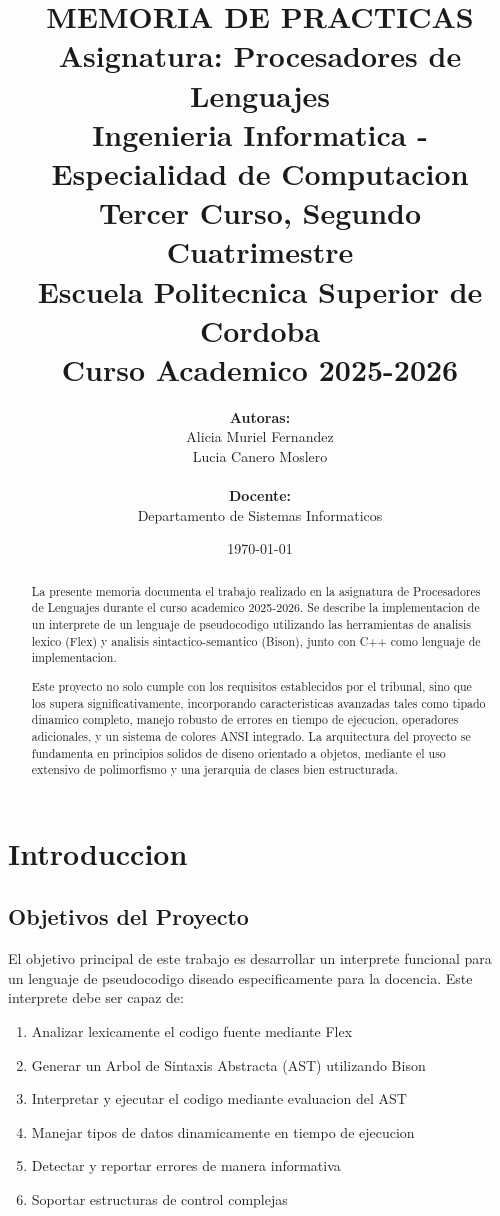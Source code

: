 \documentclass[11pt,a4paper]{article}
\title{\textbf{MEMORIA DE PRACTICAS}\\
        \large{Asignatura: Procesadores de Lenguajes}\\
        \large{Ingenieria Informatica - Especialidad de Computacion}\\
        \large{Tercer Curso, Segundo Cuatrimestre}\\
        \large{Escuela Politecnica Superior de Cordoba}\\
        \large{Curso Academico 2025-2026}}
\author{
    \textbf{Autoras:}\\
    Alicia Muriel Fernandez\\
    Lucia Canero Moslero\\
    \\
    \textbf{Docente:}\\
    Departamento de Sistemas Informaticos
}
\date{\today}
\begin{document}
\maketitle

\begin{abstract}
\noindent
La presente memoria documenta el trabajo realizado en la asignatura de Procesadores de Lenguajes durante el curso academico 2025-2026. Se describe la implementacion de un interprete de un lenguaje de pseudocodigo utilizando las herramientas de analisis lexico (Flex) y analisis sintactico-semantico (Bison), junto con C++ como lenguaje de implementacion.

Este proyecto no solo cumple con los requisitos establecidos por el tribunal, sino que los supera significativamente, incorporando caracteristicas avanzadas tales como tipado dinamico completo, manejo robusto de errores en tiempo de ejecucion, operadores adicionales, y un sistema de colores ANSI integrado. La arquitectura del proyecto se fundamenta en principios solidos de diseno orientado a objetos, mediante el uso extensivo de polimorfismo y una jerarquia de clases bien estructurada.
\end{abstract}

\tableofcontents
\newpage

\section{Introduccion}

\subsection{Objetivos del Proyecto}

El objetivo principal de este trabajo es desarrollar un interprete funcional para un lenguaje de pseudocodigo diseado especificamente para la docencia. Este interprete debe ser capaz de:

\begin{enumerate}
    \item Analizar lexicamente el codigo fuente mediante Flex
    \item Generar un Arbol de Sintaxis Abstracta (AST) utilizando Bison
    \item Interpretar y ejecutar el codigo mediante evaluacion del AST
    \item Manejar tipos de datos dinamicamente en tiempo de ejecucion
    \item Detectar y reportar errores de manera informativa
    \item Soportar estructuras de control complejas
\end{enumerate}
\end{document}
